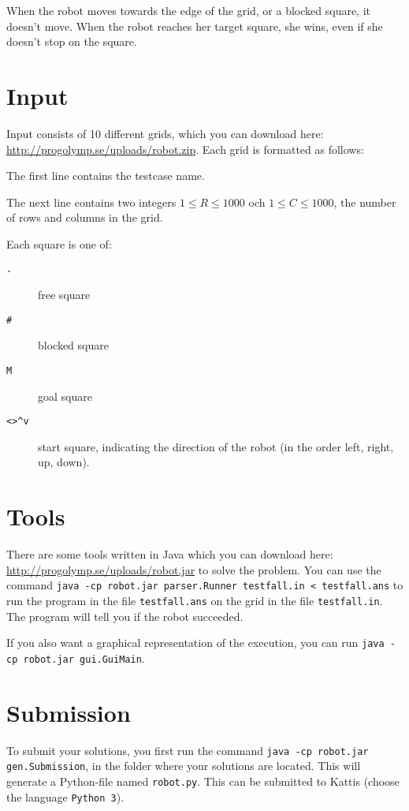 When the robot moves towards the edge of the grid, or a blocked square, it doesn't move. When the robot reaches her target square, she wins, even if she doesn't stop on the square.

\section*{Input}
Input consists of 10 different grids, which you can download here: \url{http://progolymp.se/uploads/robot.zip}. Each grid is formatted as follows:

The first line contains the testcase name.

The next line contains two integers $1 \le R \le 1000$ och $1 \le C \le 1000$, the number of rows and columns in the grid.

Each square is one of:
\begin{description}
  \item[\texttt{.}] free square
  \item[\texttt{\#}] blocked square
  \item[\texttt{M}] goal square
  \item[\texttt{<>\textasciicircum{}v}] start square, indicating the direction of the robot (in the order left, right, up, down).
\end{description}

\section*{Tools}
There are some tools written in Java which you can download here: \url{http://progolymp.se/uploads/robot.jar} to solve the problem. You can use the command \texttt{java -cp robot.jar parser.Runner testfall.in < testfall.ans} 
to run the program in the file \texttt{testfall.ans} on the grid in the file \texttt{testfall.in}. The program will tell you if the robot succeeded.

If you also want a graphical representation of the execution, you can run \texttt{java -cp robot.jar gui.GuiMain}.

\section*{Submission}
To submit your solutions, you first run the command \texttt{java -cp robot.jar gen.Submission}, in the folder where your solutions are located. This will generate a Python-file named \texttt{robot.py}.
This can be submitted to Kattis (choose the language \texttt{Python 3}).

